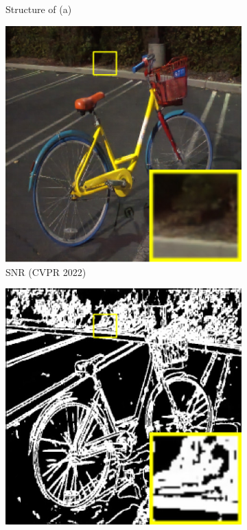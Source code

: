 \documentclass[a4paper, 10pt]{article}
\begin{document}
\begin{figure}[htb]
\begin{subfigure}{0.25\columnwidth}
			\captionsetup{font=scriptsize}
			\caption{Structure of (a)}
			\label{fig: Structure of (a)}	
		\end{subfigure}
		\begin{subfigure}{0.25\columnwidth}
			\includegraphics[width=\linewidth]{picture/LLIE/Structure Modeling and Guidance/SNR (CVPR 2022)}
			\captionsetup{font=scriptsize}
			\caption{SNR (CVPR 2022)}
			\label{fig: SNR (CVPR 2022)}	
		\end{subfigure}
		\begin{subfigure}{0.25\columnwidth}
			\includegraphics[width=\linewidth]{picture/LLIE/Structure Modeling and Guidance/Structure Modeling}

\end{subfigure}
\end{figure}
\end{document}
